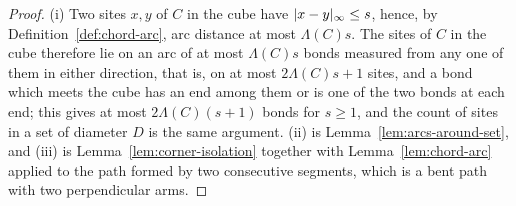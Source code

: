 \documentclass[11pt]{preprint}
\DeclarePairedDelimiter{\abs}{\lvert}{\rvert}
\numberwithin{equation}{section}
\theoremstyle{definition}
\theoremstyle{remark}
\theoremstyle{plain}
\begin{document}
\begin{proof}
(i) Two sites $x, y$ of $C$ in the cube have $\abs{x - y}_\infty \leq s$, hence, by Definition~\ref{def:chord-arc}, arc distance at most $\Lambda(C)s$. The sites of $C$ in the cube therefore lie on an arc of at most $\Lambda(C)s$ bonds measured from any one of them in either direction, that is, on at most $2\Lambda(C)s + 1$ sites, and a bond which meets the cube has an end among them or is one of the two bonds at each end; this gives at most $2\Lambda(C)(s + 1)$ bonds for $s \geq 1$, and the count of sites in a set of diameter $D$ is the same argument. (ii) is Lemma~\ref{lem:arcs-around-set}, and (iii) is Lemma~\ref{lem:corner-isolation} together with Lemma~\ref{lem:chord-arc} applied to the path formed by two consecutive segments, which is a bent path with two perpendicular arms.
\end{proof}
\end{document}
